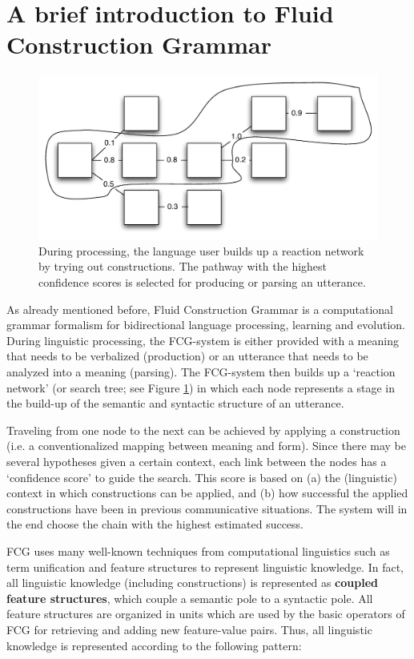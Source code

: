 \section{A brief introduction to Fluid Construction Grammar}

\begin{figure}
\centerline{\includegraphics[width=0.8\linewidth]{Chapter2/figs/reaction-network}}
  \caption[A reaction network]{During processing, the language user builds up a reaction network by trying out constructions. The pathway with the highest confidence scores is selected for producing or parsing an utterance.}
   \label{f:reaction}
\end{figure}

As already mentioned before, Fluid Construction Grammar is a computational grammar formalism for bidirectional language processing, learning and evolution. During linguistic processing, the FCG-system is either provided with a meaning that needs to be verbalized (production) or an utterance that needs to be analyzed into a meaning (parsing). The FCG-system then builds up a `reaction network' (or search tree; see Figure \ref{f:reaction}) in which each node represents a stage in the build-up of the semantic and syntactic structure of an utterance. 

Traveling from one node to the next can be achieved by applying a construction (i.e. a conventionalized mapping between meaning and form). Since there may be several hypotheses given a certain context, each link between the nodes has a `confidence score' to guide the search. This score is based on (a) the (linguistic) context in which constructions can be applied, and (b) how successful the applied constructions have been in previous communicative situations. The system will in the end choose the chain with the highest estimated success.

FCG uses many well-known techniques from computational linguistics such as term unification and feature structures to represent linguistic knowledge. In fact, all linguistic knowledge (including constructions) is represented as {\bfseries coupled feature structures}, which couple a semantic pole to a syntactic pole. All feature structures are organized in units which are used by the basic operators of FCG for retrieving and adding new feature-value pairs. Thus, all linguistic knowledge is represented according to the following pattern:

